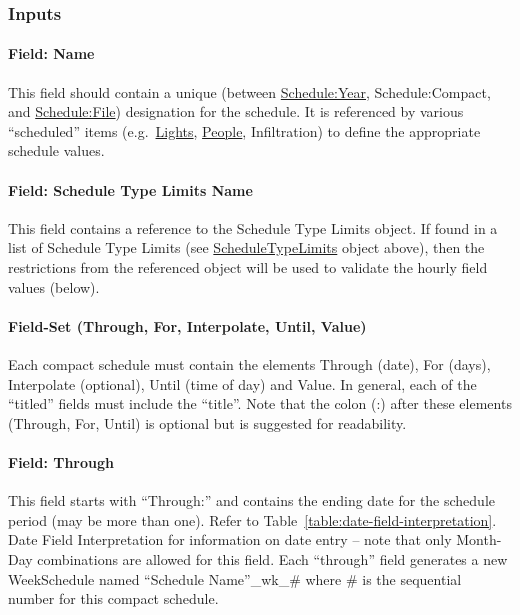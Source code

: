 \subsubsection{Inputs}\label{inputs-7-023}

\paragraph{Field: Name}\label{field-name-6-019}

This field should contain a unique (between \hyperref[scheduleyear]{Schedule:Year}, Schedule:Compact, and \hyperref[schedulefile]{Schedule:File}) designation for the schedule. It is referenced by various ``scheduled'' items (e.g.~\hyperref[lights-000]{Lights}, \hyperref[people]{People}, Infiltration) to define the appropriate schedule values.

\paragraph{Field: Schedule Type Limits Name}\label{field-schedule-type-limits-name-4}

This field contains a reference to the Schedule Type Limits object. If found in a list of Schedule Type Limits (see \hyperref[scheduletypelimits]{ScheduleTypeLimits} object above), then the restrictions from the referenced object will be used to validate the hourly field values (below).

\paragraph{Field-Set (Through, For, Interpolate, Until, Value)}\label{field-set-through-for-interpolate-until-value}

Each compact schedule must contain the elements Through (date), For (days), Interpolate (optional), Until (time of day) and Value. In general, each of the ``titled'' fields must include the ``title''. Note that the colon (:) after these elements (Through, For, Until) is optional but is suggested for readability.

\paragraph{Field: Through}\label{field-through}

This field starts with ``Through:'' and contains the ending date for the schedule period (may be more than one). Refer to Table~\ref{table:date-field-interpretation}. Date Field Interpretation for information on date entry -- note that only Month-Day combinations are allowed for this field. Each ``through'' field generates a new WeekSchedule named ``Schedule Name''\_wk\_\# where \# is the sequential number for this compact schedule.

